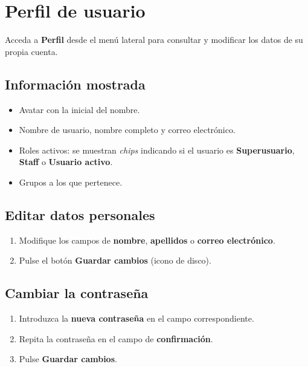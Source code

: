 \documentclass[12pt,a4paper]{article}
\begin{document}
\section{Perfil de usuario}

Acceda a \textbf{Perfil} desde el menú lateral para consultar y modificar los datos de su propia cuenta.

\subsection{Información mostrada}

\begin{itemize}
    \item Avatar con la inicial del nombre.
    \item Nombre de usuario, nombre completo y correo electrónico.
    \item Roles activos: se muestran \textit{chips} indicando si el usuario es \textbf{Superusuario}, \textbf{Staff} o \textbf{Usuario activo}.
    \item Grupos a los que pertenece.
\end{itemize}

\subsection{Editar datos personales}

\begin{enumerate}
    \item Modifique los campos de \textbf{nombre}, \textbf{apellidos} o \textbf{correo electrónico}.
    \item Pulse el botón \textbf{Guardar cambios} (icono de disco).
\end{enumerate}

\subsection{Cambiar la contraseña}

\begin{enumerate}
    \item Introduzca la \textbf{nueva contraseña} en el campo correspondiente.
    \item Repita la contraseña en el campo de \textbf{confirmación}.
    \item Pulse \textbf{Guardar cambios}.
\end{enumerate}
\end{document}
